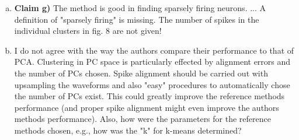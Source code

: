 \begin{enumerate}[a.]
	\item \textbf{Claim g)} The method is good in finding sparsely firing neurons. 
	...
	A definition of "sparsely firing" is missing. The number of spikes in the individual clusters in fig. 8 are not given!
	
	
	\item I do not agree with the way the authors compare their performance to that of PCA. Clustering in PC space is particularly effected by alignment errors and the number of PCs chosen. Spike alignment should be carried out with upsampling the waveforms and also "easy" procedures to automatically chose the number of PCs exist. This could greatly improve the reference methods performance (and proper spike alignment might even improve the authors methods performance). Also, how were the parameters for the reference methods chosen, e.g., how was the "k" for k-means determined?
	
	
\end{enumerate}
